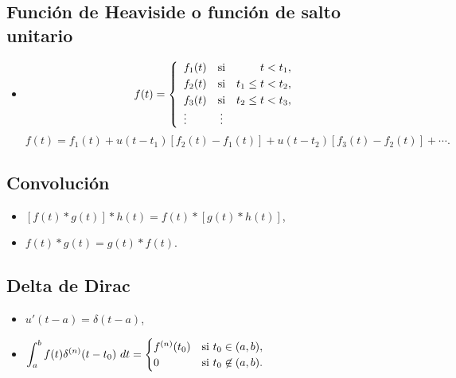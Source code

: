 \documentclass[a4,10pt,comentarios]{aleph-notas}
\newcommand{\intd}[4]{\displaystyle\int^{#2}_{#1} #3\ d#4}
\begin{document}
\subsection{Función de Heaviside o función de salto unitario}
\begin{itemize}[leftmargin=*]
\item
    \[
        f(t)=\left\{\begin{array}{l c r}
        f_1(t)&\text{si}&t<t_1,\\[1mm]
        f_2(t)&\text{si}&t_1\leq t<t_2,\\[1mm]
        f_3(t)&\text{si}&t_2\leq t<t_3,\\ \vdots&\vdots
        \end{array}\right.
    \]
    \[
        f(t)=f_1(t)+u(t-t_1)[f_2(t)-f_1(t)]+u(t-t_2)[f_3(t)-f_2(t)]+\cdots.
    \]
\end{itemize}

\subsection{Convolución}
\begin{itemize}[leftmargin=*]
\item $[f(t)\ast g(t)]\ast h(t)=f(t)\ast [g(t)\ast h(t)]$,
\item $f(t)\ast g(t)=g(t)\ast f(t)$.
\end{itemize}

\subsection{Delta de Dirac}
\begin{itemize}[leftmargin=*]
\item $u'(t-a)=\delta(t-a)$,
\item $\displaystyle \intd{a}{b}{f(t)\delta^{(n)}(t-t_0)}{t}=
        \begin{cases}
            f^{(n)}(t_0) &\text{si } t_0\in(a,b),\\
            0       &\text{si }  t_0\not\in(a,b).
        \end{cases}$
\end{itemize}
\end{document}
